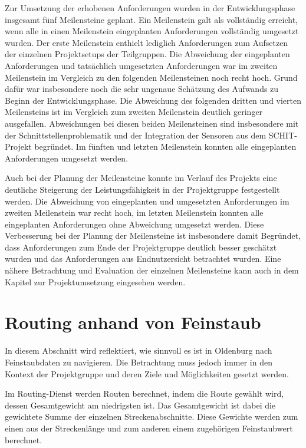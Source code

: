 Zur Umsetzung der erhobenen Anforderungen wurden in der Entwicklungsphase insgesamt fünf Meilensteine geplant. Ein Meilenstein galt als vollständig erreicht, wenn alle in einen Meilenstein eingeplanten Anforderungen vollständig umgesetzt wurden. Der erste Meilenstein enthielt lediglich Anforderungen zum Aufsetzen der einzelnen Projektsetups der Teilgruppen. Die Abweichung der eingeplanten Anforderungen und tatsächlich umgesetzten Anforderungen war im zweiten Meilenstein im Vergleich zu den folgenden Meilensteinen noch recht hoch. Grund dafür war insbesondere noch die sehr ungenaue Schätzung des Aufwands zu Beginn der Entwicklungsphase. Die Abweichung des folgenden dritten und vierten Meilensteins ist im Vergleich zum zweiten Meilenstein deutlich geringer ausgefallen. Abweichungen bei diesen beiden Meilensteinen sind insbesondere mit der Schnittstellenproblematik und der Integration der Sensoren aus dem SCHIT-Projekt begründet. Im fünften und letzten Meilenstein konnten alle eingeplanten Anforderungen umgesetzt werden.\par\medskip
Auch bei der Planung der Meilensteine konnte im Verlauf des Projekts eine deutliche Steigerung der Leistungsfähigkeit in der Projektgruppe festgestellt werden. Die Abweichung von eingeplanten und umgesetzten Anforderungen im zweiten Meilenstein war recht hoch, im letzten Meilenstein konnten alle eingeplanten Anforderungen ohne Abweichung umgesetzt werden. Diese Verbesserung bei der Planung der Meilensteine ist insbesondere damit Begründet, dass Anforderungen zum Ende der Projektgruppe deutlich besser geschätzt wurden und das Anforderungen aus Endnutzersicht betrachtet wurden. Eine nähere Betrachtung und Evaluation der einzelnen Meilensteine kann auch in dem Kapitel zur Projektumsetzung eingesehen werden.

\section{Routing anhand von Feinstaub}
In diesem Abschnitt wird reflektiert, wie sinnvoll es ist in Oldenburg nach Feinstaubdaten zu navigieren. Die Betrachtung muss jedoch immer in den Kontext der Projektgruppe und deren Ziele und Möglichkeiten gesetzt werden.

Im Routing-Dienst werden Routen berechnet, indem die Route gewählt wird, dessen Gesamtgewicht am niedrigsten ist. Das Gesamtgewicht ist dabei die gewichtete Summe der einzelnen Streckenabschnitte. Diese Gewichte werden zum einen aus der Streckenlänge und zum anderen einem zugehörigen Feinstaubwert berechnet.

